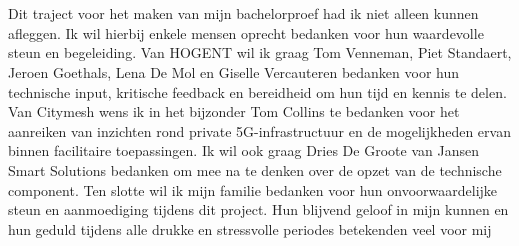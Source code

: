 
\chapter*{}%
\label{ch:voorwoord}

Dit traject voor het maken van mijn bachelorproef had ik niet alleen kunnen afleggen. Ik wil hierbij enkele mensen oprecht bedanken voor hun waardevolle steun en begeleiding.
\newline
\newline
Van HOGENT wil ik graag Tom Venneman, Piet Standaert, Jeroen Goethals, Lena De Mol en Giselle Vercauteren bedanken voor hun technische input, kritische feedback en bereidheid om hun tijd en kennis te delen. Van Citymesh wens ik in het bijzonder Tom Collins te bedanken voor het aanreiken van inzichten rond private 5G-infrastructuur en de mogelijkheden ervan binnen facilitaire toepassingen. Ik wil ook graag Dries De Groote van Jansen Smart Solutions bedanken om mee na te denken over de opzet van de technische component.
\newline
\newline
Ten slotte wil ik mijn familie bedanken voor hun onvoorwaardelijke steun en aanmoediging tijdens dit project. Hun blijvend geloof in mijn kunnen en hun geduld tijdens alle drukke en stressvolle periodes betekenden veel voor mij


